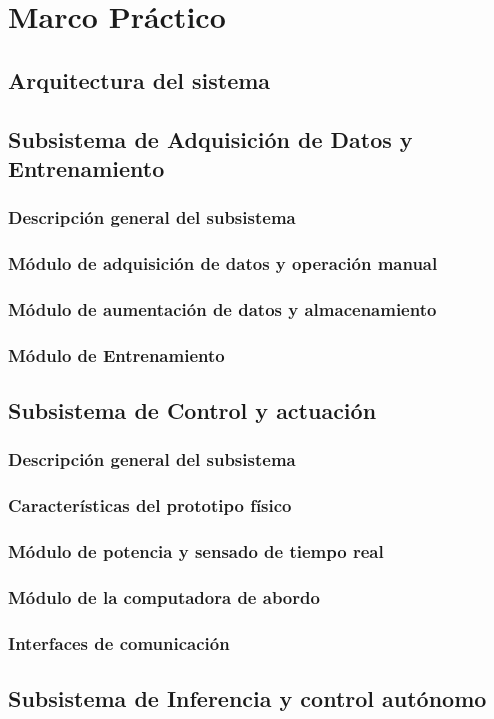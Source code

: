 \chapter{Marco Práctico} \label{ch:m_practico}
\section{Arquitectura del sistema}
    \subsection{}
        \subsubsection{}
\section{Subsistema de Adquisición de Datos y Entrenamiento}
    \subsection{Descripción general del subsistema}
    \subsection{Módulo de adquisición de datos y operación manual}
    \subsection{Módulo de aumentación de datos y almacenamiento}
    \subsection{Módulo de Entrenamiento}
\section{Subsistema de Control y actuación}
    \subsection{Descripción general del subsistema}
    \subsection{Características del prototipo físico}
    \subsection{Módulo de potencia y sensado de tiempo real}
    \subsection{Módulo de la computadora de abordo}
    \subsection{Interfaces de comunicación}
    
\section{Subsistema de Inferencia y control autónomo}